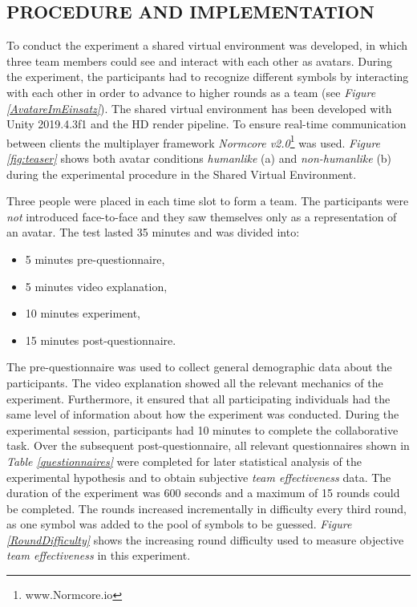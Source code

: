 \documentclass[sigchi]{acmart}
\begin{document}
\subsection{PROCEDURE AND IMPLEMENTATION}
To conduct the experiment a shared virtual environment was developed, in which three team members could see and interact with each other as avatars. During the experiment, the participants had to recognize different symbols by interacting with each other in order to advance to higher rounds as a team (see \textit{Figure \ref{AvatareImEinsatz}}). The shared virtual environment has been developed with Unity 2019.4.3f1 and the HD render pipeline. To ensure real-time communication between clients the multiplayer framework \textit{Normcore v2.0}\footnote{www.Normcore.io} was used.
\textit{Figure \ref{fig:teaser}} shows both avatar conditions \textit{humanlike} (a) and \textit{non-humanlike} (b) during the experimental procedure in the Shared Virtual Environment.

Three people were placed in each time slot to form a team. The participants were \textit{not} introduced face-to-face and they saw themselves only as a representation of an avatar.
The test lasted 35 minutes and was divided into:
		\begin{itemize}
			\item 5 minutes pre-questionnaire,
			\item 5 minutes video explanation,
			\item 10 minutes experiment,
			\item 15 minutes post-questionnaire.
		\end{itemize}
The pre-questionnaire was used to collect general demographic data about the participants. The video explanation showed all the relevant mechanics of the experiment. Furthermore, it ensured that all participating individuals had the same level of information about how the experiment was conducted. During the experimental session, participants had 10 minutes to complete the collaborative task. Over the subsequent post-questionnaire, all relevant questionnaires shown in \textit{Table \ref{questionnaires}} were completed for later statistical analysis of the experimental hypothesis and to obtain subjective \textit{team effectiveness} data. The duration of the experiment was 600 seconds and a maximum of 15 rounds could be completed. The rounds increased incrementally in difficulty every third round, as one symbol was added to the pool of symbols to be guessed.
\textit{Figure \ref{RoundDifficulty}} shows the increasing round difficulty used to measure objective \textit{team effectiveness} in this experiment.
\end{document}
